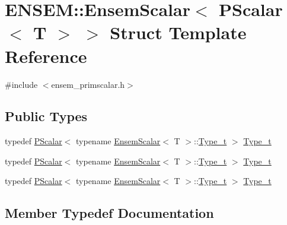 \hypertarget{structENSEM_1_1EnsemScalar_3_01PScalar_3_01T_01_4_01_4}{}\section{E\+N\+S\+EM\+:\+:Ensem\+Scalar$<$ P\+Scalar$<$ T $>$ $>$ Struct Template Reference}
\label{structENSEM_1_1EnsemScalar_3_01PScalar_3_01T_01_4_01_4}


{\ttfamily \#include $<$ensem\+\_\+primscalar.\+h$>$}

\subsection*{Public Types}
\begin{DoxyCompactItemize}
\item 
typedef \mbox{\hyperlink{classENSEM_1_1PScalar}{P\+Scalar}}$<$ typename \mbox{\hyperlink{structENSEM_1_1EnsemScalar}{Ensem\+Scalar}}$<$ T $>$\+::\mbox{\hyperlink{structENSEM_1_1EnsemScalar_3_01PScalar_3_01T_01_4_01_4_a6f38dbaec74e64f56351f84b5d2c8c0c}{Type\+\_\+t}} $>$ \mbox{\hyperlink{structENSEM_1_1EnsemScalar_3_01PScalar_3_01T_01_4_01_4_a6f38dbaec74e64f56351f84b5d2c8c0c}{Type\+\_\+t}}
\item 
typedef \mbox{\hyperlink{classENSEM_1_1PScalar}{P\+Scalar}}$<$ typename \mbox{\hyperlink{structENSEM_1_1EnsemScalar}{Ensem\+Scalar}}$<$ T $>$\+::\mbox{\hyperlink{structENSEM_1_1EnsemScalar_3_01PScalar_3_01T_01_4_01_4_a6f38dbaec74e64f56351f84b5d2c8c0c}{Type\+\_\+t}} $>$ \mbox{\hyperlink{structENSEM_1_1EnsemScalar_3_01PScalar_3_01T_01_4_01_4_a6f38dbaec74e64f56351f84b5d2c8c0c}{Type\+\_\+t}}
\item 
typedef \mbox{\hyperlink{classENSEM_1_1PScalar}{P\+Scalar}}$<$ typename \mbox{\hyperlink{structENSEM_1_1EnsemScalar}{Ensem\+Scalar}}$<$ T $>$\+::\mbox{\hyperlink{structENSEM_1_1EnsemScalar_3_01PScalar_3_01T_01_4_01_4_a6f38dbaec74e64f56351f84b5d2c8c0c}{Type\+\_\+t}} $>$ \mbox{\hyperlink{structENSEM_1_1EnsemScalar_3_01PScalar_3_01T_01_4_01_4_a6f38dbaec74e64f56351f84b5d2c8c0c}{Type\+\_\+t}}
\end{DoxyCompactItemize}


\subsection{Member Typedef Documentation}
\mbox{\label{structENSEM_1_1EnsemScalar_3_01PScalar_3_01T_01_4_01_4_a6f38dbaec74e64f56351f84b5d2c8c0c}} 
